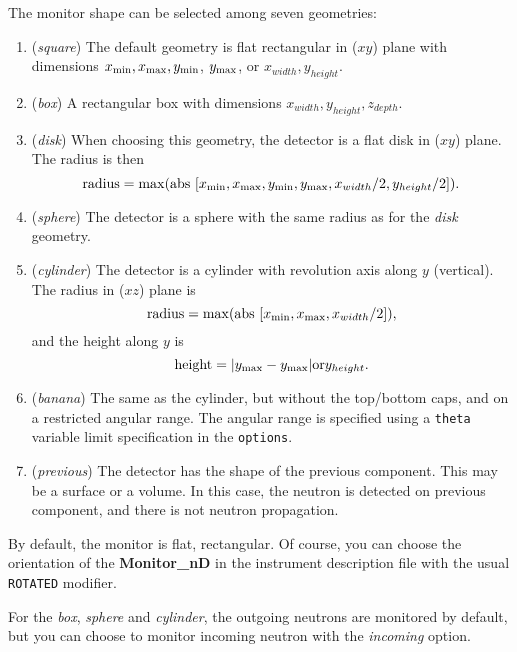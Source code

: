 The monitor shape can be selected among seven geometries:
\begin{enumerate}
\item{({\it square}) The default geometry is flat rectangular in ($xy$)
    plane with dimensions $x_{\rm min}, x_{\rm max}, y_{\rm min}$,
    $y_{\rm max}$, or $x_{width}, y_{height}$.}
\item{({\it box}) A rectangular box with dimensions $x_{width}, y_{height}, z_{depth}$.}
\item{({\it disk}) When choosing this geometry, the detector is a flat
    disk in ($xy$) plane. The radius is then
    \begin{equation}
      \mbox{radius} = \max ( \mbox{abs } [ x_{\rm min}, x_{\rm max}, y_{\rm
        min}, y_{\rm max}, x_{width}/2, y_{height}/2 ] ).
    \end{equation}
    }
\item{({\it sphere}) The detector is a sphere with the same radius as
    for the {\it disk} geometry.}
\item{({\it cylinder}) The detector is a cylinder with revolution axis
    along $y$ (vertical). The radius in ($xz$) plane is
    \begin{equation}
      \mbox{radius} =  \max ( \mbox{abs } [ x_{\rm min}, x_{\rm max}, x_{width}/2 ] ),
    \end{equation}
    and the height along $y$ is
    \begin{equation}
      \mbox{height} =  | y_{\rm max} - y_{\rm max} | {\rm or} y_{height}.
    \end{equation}
    }
\item{({\it banana}) The same as the cylinder, but without the top/bottom caps, and on a restricted angular range. The angular range is specified using a \verb+theta+ variable limit specification in the \verb+options+.}
\item{({\it previous}) The detector has the shape of the previous component. This may be a surface or a volume. In this case, the neutron is detected on previous component, and there is not neutron propagation.}
\end{enumerate}

By default, the monitor is flat, rectangular. Of course, you can choose
the orientation of the {\bf Monitor\_nD} in the instrument description
file with the usual \texttt{ROTATED} modifier.

For the {\it box}, {\it sphere} and {\it cylinder}, the outgoing neutrons are
monitored by default, but you can choose to monitor incoming neutron
with the {\it incoming} option.

